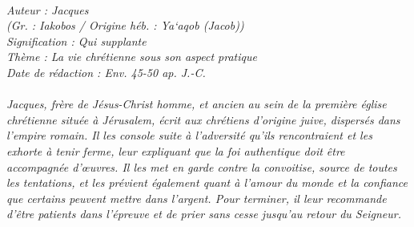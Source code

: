 \BFont
\noindent\hrulefill
{\footnotesize
\textit{
\bigskip
{\centering{}
\\Auteur : Jacques
\\(Gr. : Iakobos / Origine héb. : Ya`aqob (Jacob))
\\Signification : Qui supplante
\\Thème : La vie chrétienne sous son aspect pratique
\\Date de rédaction : Env. 45-50 ap. J.-C.\\}
}
\textit{
\\Jacques, frère de Jésus-Christ homme, et ancien au sein de la première église chrétienne située à Jérusalem, écrit aux chrétiens d'origine juive, dispersés dans l'empire romain. Il les console suite à l'adversité qu'ils rencontraient et les exhorte à tenir ferme, leur expliquant que la foi authentique doit être accompagnée d'œuvres. Il les met en garde contre la convoitise, source de toutes les tentations, et les prévient également quant à l'amour du monde et la confiance que certains peuvent mettre dans l'argent. Pour terminer, il leur recommande d'être patients dans l'épreuve et de prier sans cesse jusqu'au retour du Seigneur.\bigskip
}
}
\par\nobreak\noindent\hrulefill
